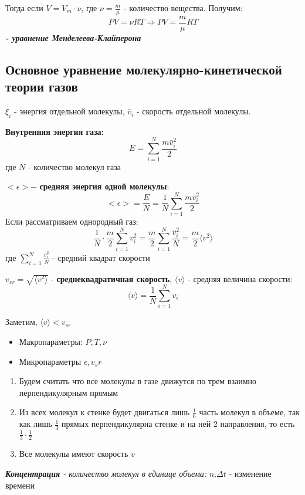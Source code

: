 \vspace{5px}

Тогда если $V = V_m \cdot \nu$, где $\nu = \frac{m}{\mu}$ - количество вещества. Получим:
\[ PV = \nu R T \Rightarrow PV = \frac{m}{\mu} R T \]
\textit{\textbf{- уравнение Менделеева-Клайперона}}


\subsection{Основное уравнение молекулярно-кинетической теории газов}

$\xi_i$ - энергия отдельной молекулы, $\bar v_i$ - скорость отдельной молекулы.

\vspace{6px}

\textbf{Внутренняя энергия газа:} \[ E = \sum_{i = 1}^N \frac{m \bar v_i^2}{2}\] где $N$ - количество молекул газа

\vspace{6px}

$<\epsilon> - $ \textbf{средняя энергия одной молекулы}:
\[ <\epsilon> = \frac{E}{N} = \frac{1}{N} \sum_{i = 1}^N \frac{m \bar v_i^2}{2} \]
Если рассматриваем однородный газ:
\[ \frac{1}{N} \cdot \frac{m}{2} \sum_{i = 1}^N {\bar v_i^2} = \frac{m}{2} \sum_{i = 1}^N \frac{\bar v_i^2}{N} = \frac{m}{2} \langle v^2 \rangle\]
где $\sum_{i = 1}^N \frac{\bar v_i^2}{N}$ - средний квадрат скорости

\vspace{6px}

$v_{sr} = \sqrt{\langle v^2 \rangle}$ - \textbf{среднеквадратичная скорость}, $\langle v \rangle$ - средняя величина скорости: \[ \langle v \rangle = \frac{1}{N}\sum_{i = 1}^N {v_i} \]

Заметим, $\langle v \rangle < v_{sr}$

\vspace{6px}
\begin{itemize}
    \item Макропараметры: $P, T ,\nu$
    \item Микропараметры $\epsilon, v_sr$
\end{itemize}

\begin{enumerate}
    \item Будем считать что все молекулы в газе движутся по трем взаимно перпендикулярным прямым
    \item Из всех молекул к стенке будет двигаться лишь $\frac{1}{6}$ часть молекул в объеме, так как лишь $\frac{1}{3}$ прямых перпендикулярна стенке и на ней 2 направления, то есть $\frac{1}{3} \cdot \frac{1}{2}$
    \item Все молекулы имеют скорость $v$
\end{enumerate}
 \textit{\textbf{Концентрация} - количество молекул в единице объема:} $n. \Delta t$ - изменение времени

